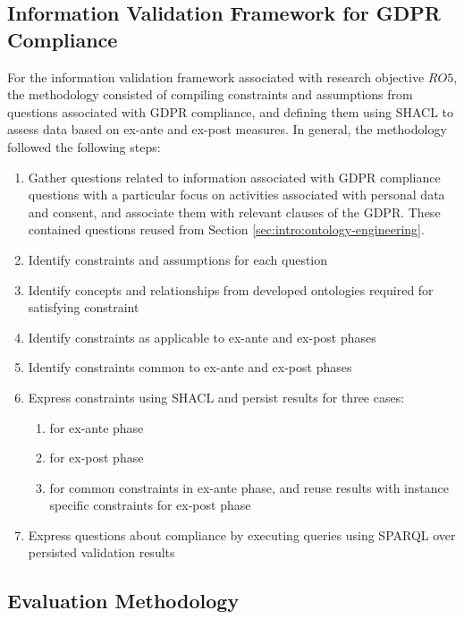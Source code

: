 \subsection{Information Validation Framework for GDPR Compliance}
For the information validation framework associated with research objective $RO5$, the methodology consisted of compiling constraints and assumptions from questions associated with GDPR compliance, and defining them using SHACL to assess data based on ex-ante and ex-post measures.
In general, the methodology followed the following steps:
\begin{enumerate}
	\item Gather questions related to information associated with GDPR compliance questions with a particular focus on activities associated with personal data and consent, and associate them with relevant clauses of the GDPR. These contained questions reused from Section \ref{sec:intro:ontology-engineering}.
	\item Identify constraints and assumptions for each question
    \item Identify concepts and relationships from developed ontologies required for satisfying constraint
    \item Identify constraints as applicable to ex-ante and ex-post phases
    \item Identify constraints common to ex-ante and ex-post phases
    \item Express constraints using SHACL and persist results for three cases:
    \begin{enumerate}
        \item for ex-ante phase
        \item for ex-post phase
        \item for common constraints in ex-ante phase, and reuse results with instance specific constraints for ex-post phase
    \end{enumerate}
    \item Express questions about compliance by executing queries using SPARQL over persisted validation results 
\end{enumerate}

\subsection{Evaluation Methodology}\label{sec:intro:evaluation}
